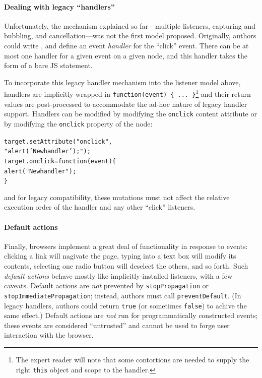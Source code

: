 \documentclass[letterpaper,10pt,twocolumn]{article}
\newcommand{\quot}{\mbox{\tt\char'042}}
\newcommand{\wild}{\mbox{\tt\char'137}}
\newcommand{\impl}[1]{{\def\_{\wild}\def\"{\quot}\tt#1}}
\DeclareRobustCommand{\spec}[1]{\textsf{#1}\xspace}
\DeclareRobustCommand\JS{\spec{JS}}
\begin{document}
\paragraph{Dealing with legacy ``handlers''}
Unfortunately, the mechanism explained so far---multiple listeners,
capturing and bubbling, and cancellation---was not the first model
proposed.  Originally, authors could write
\etag{span}{\attr{onclick}{\impl{alert("In onclick");}}}, and define an event
\emph{handler} for the ``click'' event.  There can be at most one
handler for a given event on a given node, and this handler takes the
form of a bare \JS statement.  

To incorporate this legacy handler mechanism into the listener model
above, handlers are implicitly wrapped in \impl{function(event) \{
  ... \}}\footnote{The expert reader will note that some contortions
  are needed to supply the right \impl{this} object and scope to the
  handler.} and their return values are post-processed to accommodate
the ad-hoc nature of legacy handler support.  Handlers can be modified
by modifying the \impl{onclick} content attribute or by modifying the
\impl{onclick} property of the node:
\begin{alltt}
  target.setAttribute("onclick", 
           "alert('New handler');");
  target.onclick = function(event) \{ 
                     alert("New handler"); 
                   \}
\end{alltt}
and for legacy compatibility, these mutations must not affect the
relative execution order of the handler and any other ``click'' listeners.

\paragraph{Default actions}
Finally, browsers implement a great deal of functionality in response
to events: clicking a link will nagivate the page, typing into a text
box will modify its contents, selecting one radio button will deselect
the others, and so forth.  Such \emph{default actions} behave mostly
like implicitly-installed listeners, with a few caveats.  Default
actions are \emph{not} prevented by \impl{stopPropagation} or
\impl{stopImmediatePropagation}; instead, authors must call
\impl{preventDefault}.  (In legacy handlers, authors could return
\impl{true} (or sometimes \impl{false}) to achive the same effect.)
Default actions are \emph{not} run for programmatically constructed
events; these events are considered ``untrusted'' and cannot be used
to forge user interaction with the browser.
\end{document}
